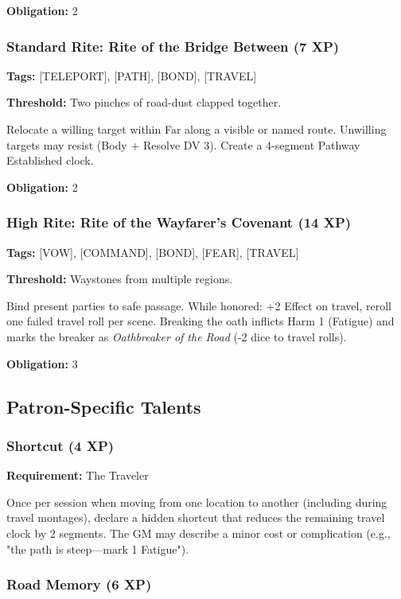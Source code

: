\textbf{Obligation:} 2

\subsubsection{Standard Rite: Rite of the Bridge Between (7 XP)}

\textbf{Tags:} [TELEPORT], [PATH], [BOND], [TRAVEL]

\textbf{Threshold:} Two pinches of road-dust clapped together.

Relocate a willing target within Far along a visible or named route. Unwilling targets may resist (Body + Resolve DV 3). Create a 4-segment Pathway Established clock.

\textbf{Obligation:} 2

\subsubsection{High Rite: Rite of the Wayfarer's Covenant (14 XP)}

\textbf{Tags:} [VOW], [COMMAND], [BOND], [FEAR], [TRAVEL]

\textbf{Threshold:} Waystones from multiple regions.

Bind present parties to safe passage. While honored: +2 Effect on travel, reroll one failed travel roll per scene. Breaking the oath inflicts Harm 1 (Fatigue) and marks the breaker as \textit{Oathbreaker of the Road} (-2 dice to travel rolls).

\textbf{Obligation:} 3

\subsection{Patron-Specific Talents}

\subsubsection{Shortcut (4 XP)}

\textbf{Requirement:} The Traveler

Once per session when moving from one location to another (including during travel montages), declare a hidden shortcut that reduces the remaining travel clock by 2 segments. The GM may describe a minor cost or complication (e.g., "the path is steep—mark 1 Fatigue").

\subsubsection{Road Memory (6 XP)}

